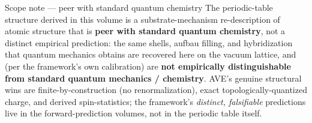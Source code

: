 \begin{resultbox}{Scope note — peer with standard quantum chemistry}
\label{box:internal_peer_scope}
The periodic-table structure derived in this volume is a substrate-mechanism re-description of atomic structure that is \textbf{peer with standard quantum chemistry}, not a distinct empirical prediction: the same shells, aufbau filling, and hybridization that quantum mechanics obtains are recovered here on the vacuum lattice, and (per the framework's own calibration) are \textbf{not empirically distinguishable from standard quantum mechanics / chemistry}. AVE's genuine structural wins are finite-by-construction (no renormalization), exact topologically-quantized charge, and derived spin-statistics; the framework's \emph{distinct, falsifiable} predictions live in the forward-prediction volumes, not in the periodic table itself.
\end{resultbox}

